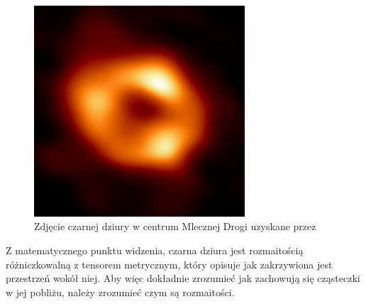 \renewcommand{\figurename}{Zdjęcie}
\begin{figure}[h]
  \centering
  \includegraphics[width=0.7\textwidth]{ilustracje/zakazany_donut.jpg}
  \caption{Zdjęcie czarnej dziury w centrum Mlecznej Drogi uzyskane przez \cite{mleczna_droga}}\label{zakazany donut}
\end{figure}

Z matematycznego punktu widzenia, czarna dziura jest rozmaitością różniczkowalną z tensorem metrycznym, który opisuje jak zakrzywiona jest przestrzeń wokół niej. Aby więc dokładnie zrozumieć jak zachowują się cząsteczki w jej pobliżu, należy zrozumieć czym są rozmaitości.%
